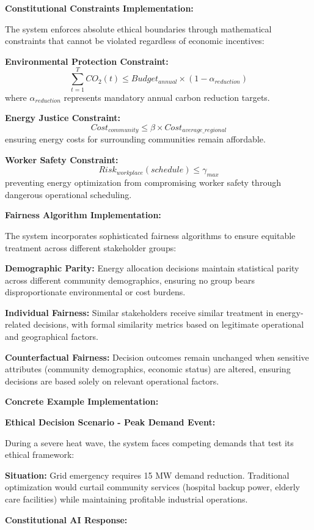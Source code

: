 \documentclass{article}
\begin{document}
\textbf{Constitutional Constraints Implementation:}

The system enforces absolute ethical boundaries through mathematical constraints that cannot be violated regardless of economic incentives:

\textbf{Environmental Protection Constraint:}
\[\sum_{t=1}^{T} CO_2(t) \leq Budget_{annual} \times (1 - \alpha_{reduction})\]
where $\alpha_{reduction}$ represents mandatory annual carbon reduction targets.

\textbf{Energy Justice Constraint:}
\[Cost_{community} \leq \beta \times Cost_{average\_regional}\]
ensuring energy costs for surrounding communities remain affordable.

\textbf{Worker Safety Constraint:}
\[Risk_{workplace}(schedule) \leq \gamma_{max}\]
preventing energy optimization from compromising worker safety through dangerous operational scheduling.

\textbf{Fairness Algorithm Implementation:}

The system incorporates sophisticated fairness algorithms to ensure equitable treatment across different stakeholder groups:

\textbf{Demographic Parity:} Energy allocation decisions maintain statistical parity across different community demographics, ensuring no group bears disproportionate environmental or cost burdens.

\textbf{Individual Fairness:} Similar stakeholders receive similar treatment in energy-related decisions, with formal similarity metrics based on legitimate operational and geographical factors.

\textbf{Counterfactual Fairness:} Decision outcomes remain unchanged when sensitive attributes (community demographics, economic status) are altered, ensuring decisions are based solely on relevant operational factors.

\textbf{Concrete Example Implementation:}

\textbf{Ethical Decision Scenario - Peak Demand Event:}

During a severe heat wave, the system faces competing demands that test its ethical framework:

\textbf{Situation:} Grid emergency requires 15 MW demand reduction. Traditional optimization would curtail community services (hospital backup power, elderly care facilities) while maintaining profitable industrial operations.

\textbf{Constitutional AI Response:}
\end{document}

